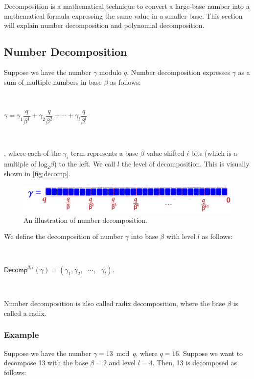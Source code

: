 Decomposition is a mathematical technique to convert a large-base number into a mathematical formula expressing the same value in a smaller base. This section will explain number decomposition and polynomial decomposition. 

\subsection{Number Decomposition}
\label{subsec:number-decomp}
Suppose we have the number $\gamma$ modulo $q$. Number decomposition expresses $\gamma$ as a sum of multiple numbers in base $\beta$ as follows: 

$ $

$\gamma = \gamma_1 \dfrac{q}{\beta^1} + \gamma_2 \dfrac{q}{\beta^2} + \cdots + \gamma_l \dfrac{q}{\beta^l}  $

$ $

\noindent , where each of the $\gamma_i$ term represents a base-$\beta$ value shifted $i$ bits (which is a multiple of $\text{log}_2 \beta$) to the left. We call $l$ the level of decomposition. This is visually shown in \autoref{fig:decomp}. %

\begin{figure}[h!]
    \centering
  \includegraphics[width=0.8\linewidth]{figures/decomp.pdf}
  \caption{An illustration of number decomposition.}
  \label{fig:decomp}
\end{figure}

We define the decomposition of number $\gamma$ into base $\beta$ with level $l$ as follows:


$ $

$\textsf{Decomp}^{\beta, l}(\gamma) = (\gamma_1, \gamma_2, \text{ } \cdots , \text{ } \gamma_l)$.
 
$ $

Number decomposition is also called radix decomposition, where the base $\beta$ is called a radix. 


\subsubsection{Example}

Suppose we have the number $\gamma = 13 \bmod q$, where $q = 16$. Suppose we want to decompose 13 with the base $\beta = 2$ and level $l = 4$. Then, 13 is decomposed as follows:

